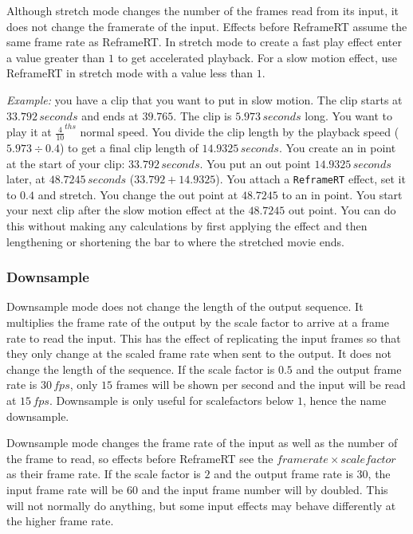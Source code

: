 Although stretch mode changes the number of the frames read from its input, it does not change the framerate of the input. Effects before ReframeRT assume the same frame rate as ReframeRT.
In stretch mode to create a fast play effect enter a value greater than $1$ to get accelerated playback.
For a slow motion effect, use ReframeRT in stretch mode with a value less than $1$.

\textit{Example:} you have a clip that you want to put in slow motion. The clip starts at $33.792\, seconds$ and ends at $39.765$. The clip is $5.973\, seconds$ long. You want to play it at $\frac{4}{10}^{ths}$ normal speed. You divide the clip length by the playback speed ($5.973\div0.4$) to get a final clip length of $14.9325\,seconds$. You create an in point at the start of your clip: $33.792\,seconds$. You put an out point $14.9325\,seconds$ later, at $48.7245\,seconds$ ($33.792 + 14.9325$). You attach a \texttt{ReframeRT} effect, set it to $0.4$ and stretch. You change the out point at $48.7245$ to an in point. You start your next clip after the slow motion effect at the $48.7245$ out point. You can do this without making any calculations by first applying the effect and then lengthening or shortening the bar to where the stretched movie ends.

\subsubsection*{Downsample}%
\label{ssub:downsample}

Downsample mode does not change the length of the output sequence. It multiplies the frame rate of the output by the scale factor to arrive at a frame rate to read the input. This has the effect of replicating the input frames so that they only change at the scaled frame rate when sent to the output. It does not change the length of the sequence. If the scale factor is $0.5$ and the output frame rate is $30 \,fps$, only $15$ frames will be shown per second and the input will be read at $15 \,fps$. Downsample is only useful for scalefactors below $1$, hence the name downsample.

Downsample mode changes the frame rate of the input as well as the number of the frame to read, so effects before ReframeRT see the $frame rate \times scale factor$ as their frame rate. If the scale factor is $2$ and the output frame rate is $30$, the input frame rate will be $60$ and the input frame number will by doubled. This will not normally do anything, but some input effects may behave differently at the higher frame rate.

